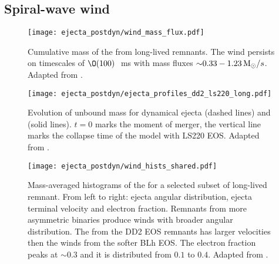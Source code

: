 \subsection{Spiral-wave wind} \label{sec:bns_sims:sww}

\begin{figure}[t]
    \centering 
    \texttt{[image: ejecta\_postdyn/wind\_mass\_flux.pdf]}
    \caption{Cumulative mass of the \swind{} from long-lived
        remnants. The wind persists on timescales of $\O(100)\,$~ms with
        mass fluxes ${\sim}0.33-1.23\,{\text{M}_{\odot}}/s$.
        Adapted from \citet{Nedora:2020pak}.
    }
    \label{fig:mej:bern}
\end{figure}

\begin{figure}[t]
    \centering 
    \texttt{[image: ejecta\_postdyn/ejecta\_profiles\_dd2\_ls220\_long.pdf]}
    \caption{Evolution of unbound mass for dynamical ejecta
        (dashed lines)
        and \wind{}
        (solid lines). $t=0$ marks the moment of merger, the vertical
        line marks the collapse time of the model with LS220 \ac{EOS}.
        Adapted from \cite{Nedora:2019jhl}.
    }
    \label{fig:mej:bern_short_long}
\end{figure}

\begin{figure*}[t]
    \centering 
    \texttt{[image: ejecta\_postdyn/wind\_hists\_shared.pdf]}
    \caption{Mass-averaged histograms of the \swind{} for a selected
        subset of long-lived remnant. From left to right: ejecta angular
        distribution, ejecta terminal velocity and electron
        fraction. Remnants from more asymmetric binaries produce winds
        with broader angular distribution.
        The \swind{} from the DD2 EOS remnants has larger velocities
        then the winds from the softer BLh EOS. The electron fraction
        peaks at ${\sim}0.3$ and it is distributed from $0.1$ to $0.4$.
        Adapted from \citet{Nedora:2020pak}.
    }
    \label{fig:ejecta:bern:hist}
\end{figure*}

